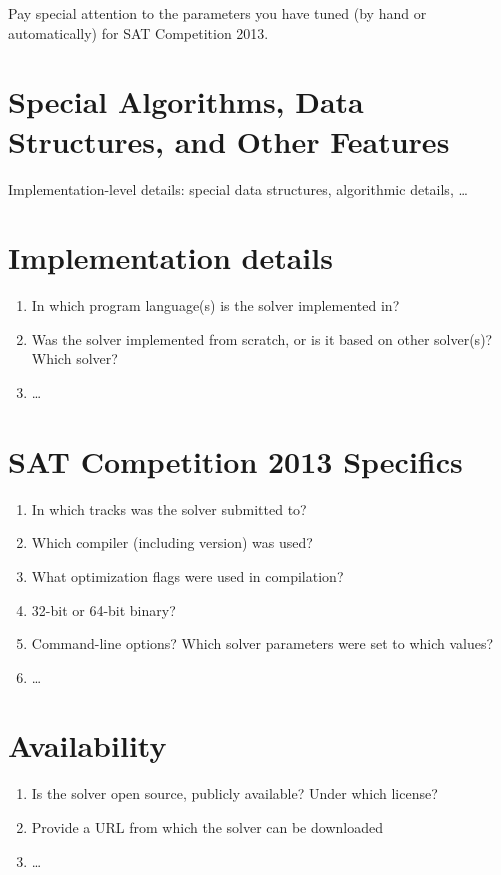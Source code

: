 \documentclass[conference]{IEEEtran}
\begin{document}
Pay special attention to the parameters you have tuned (by hand or automatically) 
for SAT Competition 2013.

\section{Special Algorithms, Data Structures, and Other Features}

Implementation-level details: special data structures, algorithmic details, \ldots


\section{Implementation details}

\begin{enumerate}
\item In which program language(s) is the solver implemented in?
\item Was the solver implemented from scratch, or is it based on other solver(s)? Which solver?
\item \ldots
\end{enumerate}
 
\section{SAT Competition 2013 Specifics}
\begin{enumerate}
  \item In which tracks was the solver submitted to?
  \item Which compiler (including version) was used?
  \item What optimization flags were used in compilation?
  \item 32-bit or 64-bit binary?
  \item Command-line options? Which solver parameters were set to which values?
\item \ldots
\end{enumerate}

\section{Availability}

\begin{enumerate}
  \item Is the solver open source, publicly available? Under which license?
  \item Provide a URL from which the solver can be downloaded
\item \ldots
\end{enumerate}
\end{document}
